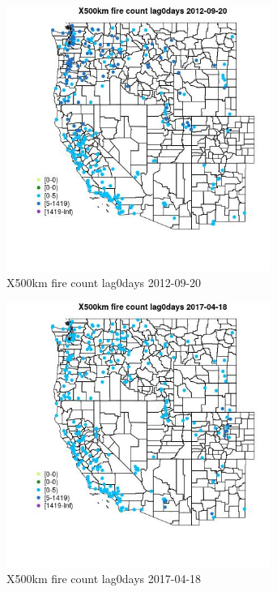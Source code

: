 \begin{figure} 
\centering  
\includegraphics[width=0.77\textwidth]{Code_Outputs/Report_ML_input_PM25_Step4_part_e_de_duplicated_aves_compiled_2019-05-14wNAs_MapObsX500km_fire_count_lag0days2012-09-20.jpg} 
\caption{\label{fig:Report_ML_input_PM25_Step4_part_e_de_duplicated_aves_compiled_2019-05-14wNAsMapObsX500km_fire_count_lag0days2012-09-20}X500km fire count lag0days 2012-09-20} 
\end{figure} 
 

\begin{figure} 
\centering  
\includegraphics[width=0.77\textwidth]{Code_Outputs/Report_ML_input_PM25_Step4_part_e_de_duplicated_aves_compiled_2019-05-14wNAs_MapObsX500km_fire_count_lag0days2017-04-18.jpg} 
\caption{\label{fig:Report_ML_input_PM25_Step4_part_e_de_duplicated_aves_compiled_2019-05-14wNAsMapObsX500km_fire_count_lag0days2017-04-18}X500km fire count lag0days 2017-04-18} 
\end{figure} 
 

